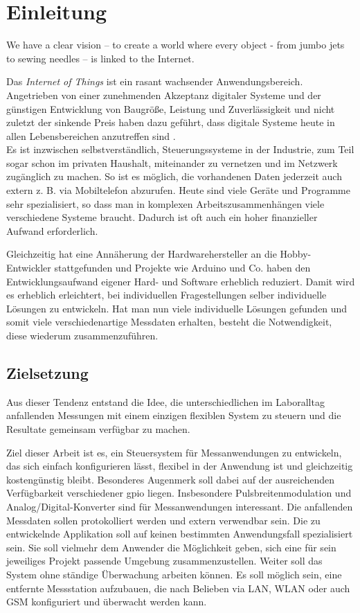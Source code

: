 \chapter{Einleitung}

\glqq We have a clear vision – to create a world where every object - from jumbo jets to sewing needles – is linked to the Internet.\grqq \cite[Helen Duce, Seite 1]{iot2020}

Das \textit{Internet of Things} ist ein rasant wachsender Anwendungsbereich. Angetrieben von einer zunehmenden Akzeptanz digitaler Systeme und der günstigen Entwicklung von Baugröße, Leistung und Zuverlässigkeit und nicht zuletzt der sinkende Preis haben dazu geführt, dass digitale Systeme heute in allen Lebensbereichen anzutreffen sind \cite{iot2020, weiser1991}.\\

Es ist inzwischen selbstverständlich, Steuerungssysteme in der Industrie, zum Teil sogar schon im privaten Haushalt, miteinander zu vernetzen und im Netzwerk zugänglich zu machen. So ist es möglich, die vorhandenen Daten jederzeit auch extern z. B. via Mobiltelefon abzurufen. Heute sind viele Geräte und Programme sehr spezialisiert, so dass man in komplexen Arbeitszusammenhängen viele verschiedene Systeme braucht. Dadurch ist oft auch ein hoher finanzieller Aufwand erforderlich.

Gleichzeitig hat eine Annäherung der Hardwarehersteller an die \glqq Hobby\grqq -Entwickler stattgefunden und Projekte wie Arduino und Co. haben den Entwicklungsaufwand eigener Hard- und Software erheblich reduziert. Damit wird es erheblich erleichtert, bei individuellen Fragestellungen selber individuelle Lösungen zu entwickeln. Hat man nun viele individuelle Lösungen gefunden und somit viele verschiedenartige Messdaten erhalten, besteht die Notwendigkeit, diese wiederum zusammenzuführen.


\section{Zielsetzung}
Aus dieser Tendenz entstand die Idee, die unterschiedlichen im Laboralltag anfallenden Messungen mit einem einzigen flexiblen System zu steuern und die Resultate gemeinsam verfügbar zu machen. 

Ziel dieser Arbeit ist es, ein Steuersystem für Messanwendungen zu entwickeln, das sich einfach konfigurieren lässt, flexibel in der Anwendung ist und gleichzeitig kostengünstig bleibt. Besonderes Augenmerk soll dabei auf der ausreichenden Verfügbarkeit verschiedener \gls{gpio} liegen. Insbesondere Pulsbreitenmodulation und Analog/Digital-Konverter sind für Messanwendungen interessant. Die anfallenden Messdaten sollen protokolliert werden und extern verwendbar sein. Die zu entwickelnde Applikation soll auf keinen bestimmten Anwendungsfall spezialisiert sein. Sie soll vielmehr dem Anwender die Möglichkeit geben, sich eine für sein jeweiliges Projekt passende Umgebung zusammenzustellen. Weiter soll das System ohne ständige Überwachung arbeiten können. Es soll möglich sein, eine  entfernte Messstation aufzubauen, die nach Belieben via LAN, WLAN oder auch GSM konfiguriert und überwacht werden kann.\\

